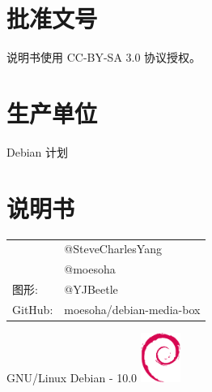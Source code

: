 \documentclass{article}
\begin{document}
\begin{multicols*}{3}
	\section*{批准文号}

	说明书使用 CC-BY-SA 3.0 协议授权。


	\section*{生产单位}

	Debian 计划


	\section*{说明书}
	\begin{tabularx}{\linewidth}{@{}ll@{}}
		\multirow{2}{*}{}{编审：} & @SteveCharlesYang\\
		~ & @moesoha \\
		图形: & @YJBeetle\\
		GitHub: & moesoha/debian-media-box\\
	\end{tabularx}


	\vfill
	\begin{flushright}
		GNU/Linux Debian - 10.0
		\linebreak
		\newline
		\includegraphics[width=13mm]{assets/debian-logo.eps}
	\end{flushright}

\end{multicols*}
\end{document}
